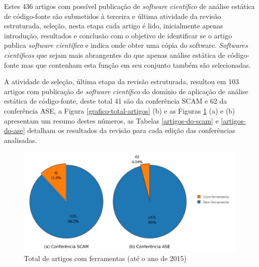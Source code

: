 Estes 436 artigos com possível publicação de {\it software científico} de
análise estática de código-fonte são submetidos à terceira e última atividade
da revisão estruturada, seleção, nesta etapa cada artigo é lido, inicialmente
apenas introdução, resultados e conclusão com o objetivo de identificar se o
artigo publica {\it software científico} e indica onde obter uma cópia do
software. {\it Softwares científicos} que sejam mais abrangentes do que apenas
análise estática de código-fonte mas que contenham esta função em seu conjunto
também são selecionadas.

A atividade de seleção, última etapa da revisão estruturada, resultou em 103
artigos com publicação de {\it software científico} do domínio de aplicação de
análise estática de código-fonte, deste total 41 são da conferência
SCAM e 62 da conferência ASE, a Figura \ref{grafico-total-artigos} (b) e as
Figuras \ref{ferramentas-por-conferencia} (a) e (b) apresentam um resumo destes
números, as Tabelas \ref{artigos-do-scam} e \ref{artigos-do-ase} detalham os
resultados da revisão para cada edição das conferências analisadas.

\begin{figure}[h]
  \center
  \includegraphics[scale=1]{imagens/ferramentas-por-conferencia.png}
  \caption{Total de artigos com ferramentas (até o ano de 2015)}
  \label{ferramentas-por-conferencia}
\end{figure}

